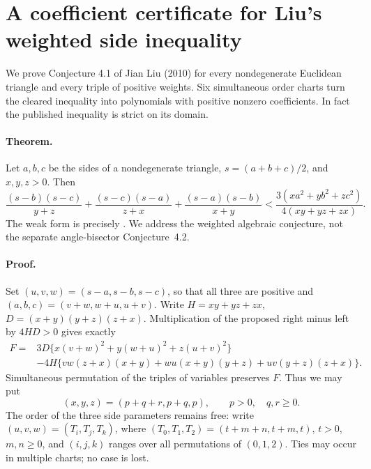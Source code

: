 \documentclass[11pt,a4paper]{article}
\numberwithin{equation}{section}
\theoremstyle{definition}
\theoremstyle{remark}
\newenvironment{sectionabstract}{\par\smallskip\begingroup\small\noindent}{\par\endgroup\medskip}
\begin{document}
\section{\texorpdfstring{A coefficient certificate for Liu's weighted side inequality}{A coefficient certificate for Liu's weighted side inequality}}\label{section:r41meiji}
\par\medskip

\begin{sectionabstract}
We prove Conjecture 4.1 of Jian Liu (2010) for every nondegenerate Euclidean triangle and every triple of positive weights. Six simultaneous order charts turn the cleared inequality into polynomials with positive nonzero coefficients. In fact the published inequality is strict on its domain.
\end{sectionabstract}
\paragraph{Theorem.}
Let $a,b,c$ be the sides of a nondegenerate triangle, $s=(a+b+c)/2$, and $x,y,z>0$. Then
\[
\frac{(s-b)(s-c)}{y+z}+\frac{(s-c)(s-a)}{z+x}
+\frac{(s-a)(s-b)}{x+y}
<\frac{3(xa^2+yb^2+zc^2)}{4(xy+yz+zx)}.
\]
The weak form is precisely \cite[Conj.~4.1, (4.30)]{r41meiji:liu}. We address the weighted algebraic conjecture, not the separate angle-bisector Conjecture~4.2.

\paragraph{Proof.} Set $(u,v,w)=(s-a,s-b,s-c)$, so that all three are positive and $(a,b,c)=(v+w,w+u,u+v)$. Write $H=xy+yz+zx$, $D=(x+y)(y+z)(z+x)$. Multiplication of the proposed right minus left by $4HD>0$ gives exactly
\begin{align*}
 F={}&3D\{x(v+w)^2+y(w+u)^2+z(u+v)^2\}\\
  &-4H\{vw(z+x)(x+y)+wu(x+y)(y+z)+uv(y+z)(z+x)\}.
\end{align*}
Simultaneous permutation of the triples of variables preserves $F$. Thus we may put
\[
 (x,y,z)=(p+q+r,p+q,p),\qquad p>0,\quad q,r\ge0 .
\]
The order of the three side parameters remains free: write $(u,v,w)=(T_i,T_j,T_k)$, where $(T_0,T_1,T_2)=(t+m+n,t+m,t)$, $t>0$, $m,n\ge0$, and $(i,j,k)$ ranges over all permutations of $(0,1,2)$. Ties may occur in multiple charts; no case is lost.
\end{document}
